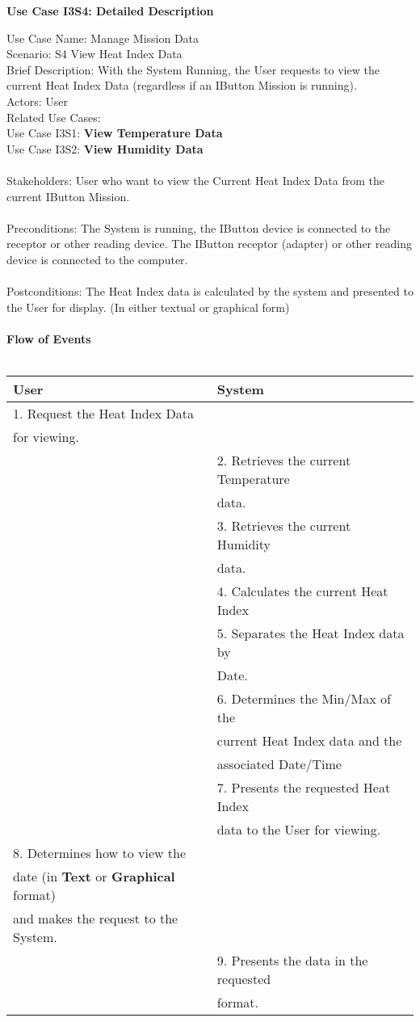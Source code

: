 \documentclass[letterpaper]{article}
\begin{document}
\noindent
\begin{center}
\textbf{Use Case I3S4:  Detailed Description}
\end{center}
Use Case Name:  Manage Mission Data\\
Scenario:  S4 View Heat Index Data\\
Brief Description:  With the System Running, the User requests to view
the current Heat Index Data  (regardless if an IButton Mission is
running).\\
Actors:  User\\
Related Use Cases:  \\
Use Case I3S1:  \textbf{View Temperature Data}\\
Use Case I3S2:  \textbf{View Humidity Data}\\\\
Stakeholders:  User who want to view the Current Heat Index Data from
the current IButton Mission.\\\\
Preconditions:  The System is running, the IButton device is connected
to the receptor or other reading device.  The IButton receptor
(adapter) or other reading device is connected to the computer.\\\\
Postconditions:  The Heat Index data is calculated by the system and
presented to the User for display. (In either textual or graphical
form)\\\\
\textbf{Flow of Events}\\\\
\begin{tabular}{|l|l|}\hline
\textbf{User} & \textbf{System}\\\hline
1.  Request the Heat Index Data & \\
for viewing. & \\\hline
& 2. Retrieves the current Temperature\\
& data.\\\hline
& 3.  Retrieves the current Humidity\\
& data.\\\hline
& 4.  Calculates the current Heat Index\\\hline
& 5.  Separates the Heat Index data by\\
& Date.\\\hline
& 6.  Determines the Min/Max of the\\
& current Heat Index data and the \\
& associated Date/Time\\\hline
& 7.  Presents the requested Heat Index\\
& data to the User for viewing.\\\hline
8.  Determines how to view the & \\
date (in \textbf{Text} or \textbf{Graphical} format) & \\
and makes the request to the System. & \\\hline
& 9.  Presents the data in the requested\\
& format.\\\hline
\end{tabular}\\\\
\end{document}
